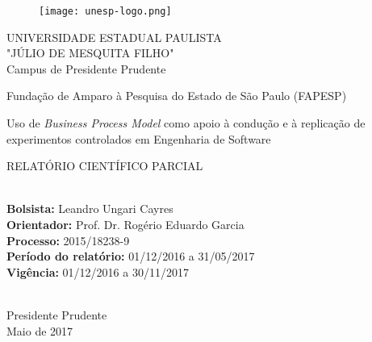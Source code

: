 \newpage
\begin{figure}[!htp]
  \texttt{[image: unesp-logo.png]}  %
\end{figure}

\hspace*{73mm}
\begin{minipage}{79mm}
	\vskip-35mm
	\begin{center}
		UNIVERSIDADE ESTADUAL PAULISTA \\[-2mm] "JÚLIO DE MESQUITA FILHO" \\[-2mm] Campus de Presidente Prudente
	\end{center}
\end{minipage}
\begin{center}
	{\large Fundação de Amparo à Pesquisa do Estado de São Paulo (FAPESP)  }
\end{center} 
\vspace*{30mm}
\begin{center}
	{\large Uso de \textit{Business Process Model} como apoio à condução e à replicação de experimentos controlados em Engenharia de Software 
  }
\end{center}

\vspace*{15mm}

\begin{center}
	{\large RELATÓRIO CIENTÍFICO PARCIAL  }\\
\end{center}



{\flushleft
	{\normalsize
		\vspace{30mm}
		\hrulefill\\
		\hspace{10mm} \textbf{Bolsista: }Leandro Ungari Cayres\\
		\hspace{10mm} \textbf{Orientador: }Prof. Dr. Rogério Eduardo Garcia\\
		\hspace{10mm} \textbf{Processo: }2015/18238-9\\
		\hspace{10mm} \textbf{Período do relatório: }01/12/2016 a 31/05/2017\\
		\hspace{10mm} \textbf{Vigência: }01/12/2016 a 30/11/2017 \\
		\hrulefill\\
	}
}

\vspace*{\fill}

\begin{center}
	Presidente Prudente \\Maio de 2017  %
\end{center}